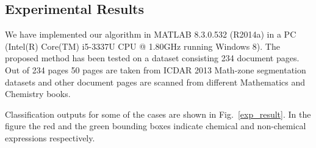 \documentclass[oneside,a4paper,12pt]{book}
\begin{document}
\subsection{Experimental Results}

We have implemented our algorithm in MATLAB 8.3.0.532
(R2014a) in a PC (Intel(R) Core(TM) i5-3337U CPU @ 1.80GHz
running Windows 8). The proposed method has been tested on
a dataset consisting 234 document pages. Out of 234 pages 50
pages are taken from ICDAR 2013 Math-zone segmentation
datasets and other document pages are scanned from different Mathematics and
Chemistry books. 

Classification outputs for some of the cases are shown in Fig.~\ref{exp_result}. In the figure  the  red and the green bounding boxes indicate chemical and 
non-chemical expressions respectively.
\end{document}
